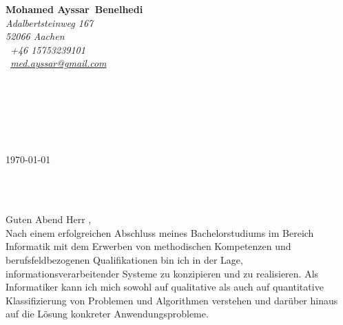 

\pagestyle{empty}


\setlength{\parindent}{0pt}
\addtolength{\parskip}{6pt}

\def\firstname{Mohamed Ayssar}
\def\familyname{Benelhedi}
\def\FileAuthor{\firstname~\familyname}
\def\FileTitle{\firstname~\familyname's Bewerbungsschreiben}
\def\FileSubject{Bewerbungsschreiben}
\def\FileKeyWords{\firstname~\familyname, Bewerbungsschreiben}

\renewcommand{\ttdefault}{pcr}



\hypersetup{pdfborder=0 0 0}


\sffamily   %
\hfill%
\begin{minipage}[t]{.6\textwidth}
	\raggedleft%
	{\bfseries {\color{firstnamecolor}\firstname}~{\color{familynamecolor}\familyname}}\\[.35ex]
	\small\itshape%
	Adalbertsteinweg 167\\
	52066 Aachen\\[.35ex]
	\Mobilefone~+46 15753239101\\
	\Letter~\href{mailto:med.ayssar@gmail.com}{med.ayssar@gmail.com}
\end{minipage}\\[0.5em]
%
%
\begin{minipage}[t]{.4\textwidth}
	\raggedright%
	\vspace*{1em}
	\firmaContact\\[.20ex]
	\firmaName\\[.35ex]
	\small%
	\firmaStreet\\
	\firmaPlzCode
\end{minipage}
%
\hfill
%
\begin{minipage}[t]{.4\textwidth}
	\raggedleft %
	\today
\end{minipage}\\[1em]
\raggedright

{\bfseries \color{familynamecolor}\jobName}\\[1.5em]

Guten Abend Herr \contact, \\[1em]
%
Nach einem erfolgreichen Abschluss meines Bachelorstudiums im Bereich Informatik mit dem Erwerben von methodischen Kompetenzen und berufsfeldbezogenen Qualifikationen bin ich in der Lage, informationsverarbeitender Systeme zu konzipieren und zu realisieren. Als Informatiker kann ich mich sowohl auf qualitative als auch auf quantitative Klassifizierung von Problemen und Algorithmen verstehen und darüber hinaus auf die Lösung konkreter Anwendungsprobleme.

